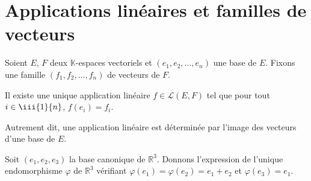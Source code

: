 \documentclass[french,11pt,twoside]{VcCours}
\begin{document}
\section{Applications linéaires et familles de vecteurs}

\begin{Proposition}{} Soient $E$, $F$ deux $\mathbb{K}$-espaces vectoriels et $(e_1, e_2, \ldots, e_n)$ une base de $E$. Fixons une famille $(f_1, f_2, \ldots, f_n)$ de vecteurs de $F$. 

Il existe une unique application linéaire $f \in \mathcal{L}(E,F)$ tel que pour tout $i \in \iii{1}{n}$, $f(e_i)=f_i$.

Autrement dit, une application linéaire est déterminée par l'image des vecteurs d'une base de $E$.
\end{Proposition}

%

\begin{Exemple} Soit $(e_1, e_2, e_3)$ la base canonique de $\mathbb{R}^3$. 
	Donnons l'expression de l'unique endomorphisme $\varphi$ de $\mathbb{R}^3$ 
	vérifiant $\varphi(e_1)= \varphi(e_2)= e_1+e_2$ et $\varphi(e_3)=e_1$.
\end{Exemple}

\newpage
\end{document}
